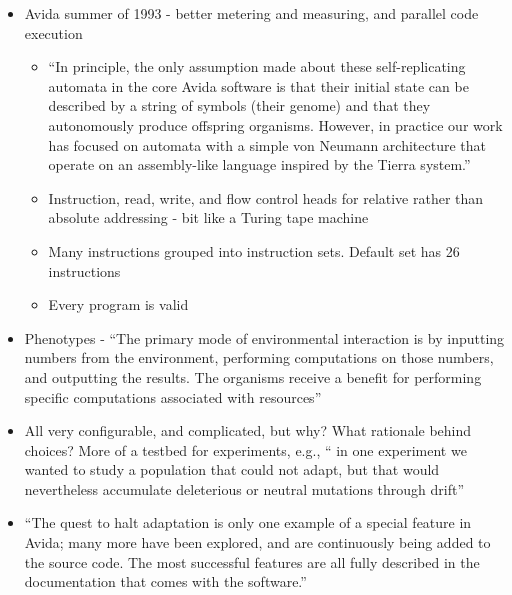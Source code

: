 \begin{itemize}
			\item
			
			Avida summer of 1993 - better metering and measuring, and parallel
			code execution
			
			
			\begin{itemize}
				\item
				
				``In principle, the only assumption made about these
				self-replicating automata in the core Avida software is that their
				initial state can be described by a string of symbols (their genome)
				and that they autonomously produce offspring organisms. However, in
				practice our work has focused on automata with a simple von Neumann
				architecture that operate on an assembly-like language inspired by
				the Tierra system.''
				
				\item
				
				Instruction, read, write, and flow control heads for relative rather
				than absolute addressing - bit like a Turing tape machine
				
				\item
				
				Many instructions grouped into instruction sets. Default set has 26
				instructions
				
				\item
				
				Every program is valid
				
			\end{itemize}
			\item
			
			Phenotypes - ``The primary mode of environmental interaction is by
			inputting numbers from the environment, performing computations on
			those numbers, and outputting the results. The organisms receive a
			benefit for performing specific computations associated with
			resources''
			
			\item
			
			All very configurable, and complicated, but why? What rationale behind
			choices? More of a testbed for experiments, e.g., `` in one experiment
			we wanted to study a population that could not adapt, but that would
			nevertheless accumulate deleterious or neutral mutations through
			drift''
			
			\item
			
			``The quest to halt adaptation is only one example of a special
			feature in Avida; many more have been explored, and are continuously
			being added to the source code. The most successful features are all
			fully described in the documentation that comes with the software.''
			
		\end{itemize}
		
